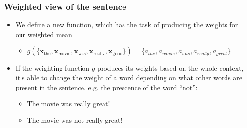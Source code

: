 \documentclass{beamer}
\renewcommand{\vec}[1]{{\boldsymbol{#1}}}
\newcommand{\svec}[2]{{\vec{#1}_{#2}}}
\begin{document}
  \begin{frame}
    \frametitle{Weighted view of the sentence}
    \begin{itemize}
          \item We define a new function, which has the task of producing the weights for our weighted mean
            \begin{itemize}
    \item $g(\{ \svec{x}{\text{the}}, \svec{x}{\text{movie}}, \svec{x}{\text{was}}, \svec{x}{\text{really}}, \svec{x}{\text{good}} \}) = \{ a_{the}, a_{movie}, a_{was}, a_{really}, a_{great} \} $
\end{itemize}

  \item If the weighting function $g$ produces its weights based on the whole context, it's able to change the weight of a word depending on what other words are present in the sentence, e.g. the prescence of the word ``not'':
    \begin{itemize}
    \item {\fontsize{5}{6}\selectfont The} {\fontsize{8}{10}\selectfont movie} {\fontsize{5}{6}\selectfont was} {\fontsize{10}{12}\selectfont really} {\fontsize{40}{48}\selectfont great}!
    \item {\fontsize{5}{6}\selectfont The} {\fontsize{8}{10}\selectfont movie} {\fontsize{5}{6}\selectfont was} {\fontsize{40}{48}\selectfont not} {\fontsize{10}{12}\selectfont really} {\fontsize{6}{7}\selectfont great}!
    \end{itemize}
  \end{itemize}
  \end{frame}
\end{document}
